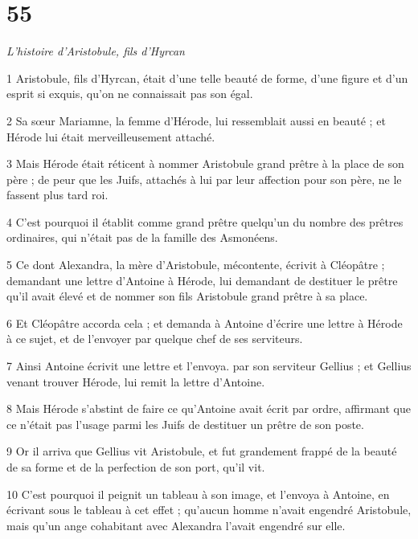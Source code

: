 \chapter{55}

\par \textit{L'histoire d'Aristobule, fils d'Hyrcan}

\par 1 Aristobule, fils d'Hyrcan, était d'une telle beauté de forme, d'une figure et d'un esprit si exquis, qu'on ne connaissait pas son égal.

\par 2 Sa sœur Mariamne, la femme d'Hérode, lui ressemblait aussi en beauté ; et Hérode lui était merveilleusement attaché.

\par 3 Mais Hérode était réticent à nommer Aristobule grand prêtre à la place de son père ; de peur que les Juifs, attachés à lui par leur affection pour son père, ne le fassent plus tard roi.

\par 4 C'est pourquoi il établit comme grand prêtre quelqu'un du nombre des prêtres ordinaires, qui n'était pas de la famille des Asmonéens.

\par 5 Ce dont Alexandra, la mère d'Aristobule, mécontente, écrivit à Cléopâtre ; demandant une lettre d'Antoine à Hérode, lui demandant de destituer le prêtre qu'il avait élevé et de nommer son fils Aristobule grand prêtre à sa place.

\par 6 Et Cléopâtre accorda cela ; et demanda à Antoine d'écrire une lettre à Hérode à ce sujet, et de l'envoyer par quelque chef de ses serviteurs.

\par 7 Ainsi Antoine écrivit une lettre et l'envoya. par son serviteur Gellius ; et Gellius venant trouver Hérode, lui remit la lettre d'Antoine.

\par 8 Mais Hérode s'abstint de faire ce qu'Antoine avait écrit par ordre, affirmant que ce n'était pas l'usage parmi les Juifs de destituer un prêtre de son poste.

\par 9 Or il arriva que Gellius vit Aristobule, et fut grandement frappé de la beauté de sa forme et de la perfection de son port, qu'il vit.

\par 10 C'est pourquoi il peignit un tableau à son image, et l'envoya à Antoine, en écrivant sous le tableau à cet effet ; qu'aucun homme n'avait engendré Aristobule, mais qu'un ange cohabitant avec Alexandra l'avait engendré sur elle.

